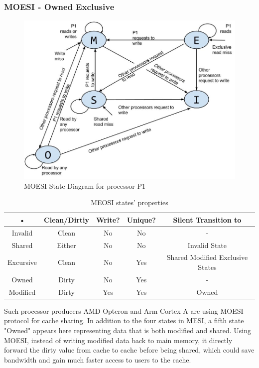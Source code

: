 \subsubsection{MOESI - Owned Exclusive}
\begin{figure}[h!]
    \centering
    \includegraphics[width=1\textwidth]{MOESIstatediagram.jpg}
    \caption{MOESI State Diagram for processor P1}
    \label{fig:MOESIstatediagram}
\end{figure}

\begin{table}[position specifier]
\centering
\begin{tabular}{|c|c|c|c|c|}
\hline 
• & Clean/Dirtiy & Write? & Unique? & Silent Transition to \\ 
\hline 
Invalid & Clean & No & No & - \\ 
\hline 
Shared & Either & No & No & Invalid State \\ 
\hline 
Excursive & Clean & No & Yes & Shared Modified Exclusive States \\ 
\hline 
Owned & Dirty & No & Yes & - \\ 
\hline 
Modified & Dirty & Yes & Yes & Owned \\ 
\hline 
\end{tabular} 
\caption{MEOSI states' properties}
\label{tab:MSItable}
\end{table}

Such processor producers AMD Opteron and Arm Cortex A are using MOESI protocol for cache sharing. In addition to the four states in MESI, a fifth state "Owned" appears here representing data that is both modified and shared. Using MOESI, instead of writing modified data back to main memory, it directly forward the dirty value from cache to cache before being shared, which could save bandwidth and gain much faster access to users to the cache.

